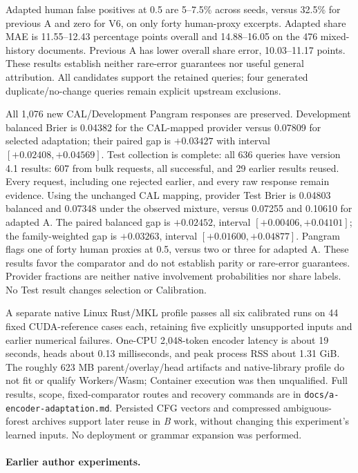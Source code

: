 Adapted human false positives at 0.5 are 5--7.5\% across seeds, versus 32.5\%
for previous A and zero for V6, on only forty human-proxy excerpts. Adapted
share MAE is 11.55--12.43 percentage points overall and 14.88--16.05 on the
476 mixed-history documents. Previous A has lower overall share error,
10.03--11.17 points. These results establish neither rare-error guarantees nor
useful general attribution. All candidates support the retained queries;
four generated duplicate/no-change queries remain explicit upstream exclusions.

All 1,076 new CAL/Development Pangram responses are preserved. Development
balanced Brier is 0.04382 for the CAL-mapped provider versus 0.07809 for selected
adaptation; their paired gap is $+0.03427$ with interval
$[+0.02408,+0.04569]$. Test collection is complete: all 636 queries have version
4.1 results: 607 from bulk requests, all successful, and 29 earlier results
reused. Every request, including one rejected earlier, and every raw response
remain evidence.
Using the unchanged CAL mapping, provider Test Brier is 0.04803 balanced and
0.07348 under the observed mixture, versus 0.07255 and 0.10610 for adapted A.
The paired balanced gap is $+0.02452$, interval $[+0.00406,+0.04101]$; the
family-weighted gap is $+0.03263$, interval $[+0.01600,+0.04877]$.
Pangram flags one of forty human proxies at 0.5, versus two or three for adapted
A. These results favor the comparator and do not establish parity or rare-error
guarantees. Provider fractions are neither native involvement probabilities nor
share labels. No Test result changes selection or Calibration.

A separate native Linux Rust/MKL profile passes all six calibrated runs on 44
fixed CUDA-reference cases each, retaining five explicitly unsupported inputs
and earlier numerical failures. One-CPU 2,048-token encoder latency is about
19 seconds, heads about 0.13 milliseconds, and peak process RSS about 1.31 GiB.
The roughly 623 MB parent/overlay/head artifacts and native-library profile do
not fit or qualify Workers/Wasm; Container execution was then unqualified.
Full results, scope, fixed-comparator routes and recovery commands are in
\texttt{docs/a-encoder-adaptation.md}. Persisted CFG vectors and compressed
ambiguous-forest archives support later reuse in \textit{B} work, without
changing this experiment's learned inputs. No deployment or grammar expansion was performed.

\paragraph{Earlier author experiments.}

